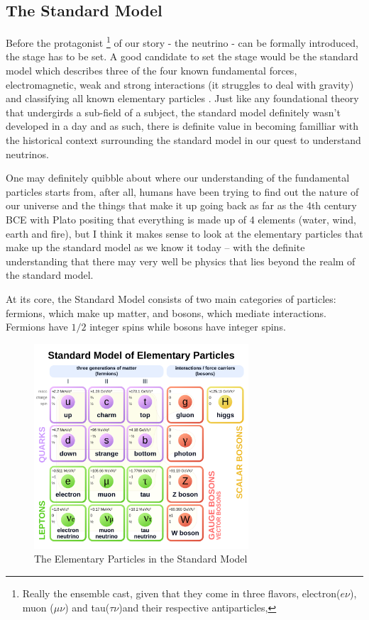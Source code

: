 \subsection{The Standard Model}

Before the protagonist
\footnote{Really the ensemble cast, given that they come in three flavors, electron($e\nu$), muon ($\mu \nu$) and tau($\tau \nu$)and their respective antiparticles,}
of our story - the neutrino - can be formally introduced, the stage has to be set.
A good candidate to set the stage would be the standard model which describes three of the four known fundamental forces, electromagnetic, weak and strong interactions (it struggles to deal with  gravity) and classifying all known elementary particles \cite{Oerter}.
Just like any foundational theory that undergirds a sub-field of a subject, the standard model definitely wasn't developed in a day and as such, there is definite value in becoming familliar with the historical context surrounding the standard model in our quest to understand neutrinos.

One may definitely quibble about where our understanding of the fundamental particles starts from, after all, humans have been trying to find out the nature of our universe and the things that make it up going back as far as the 4th century BCE with Plato positing that everything is made up of 4 elements (water, wind, earth and fire)\cite{Timaeus}, but I think it makes sense to look at the elementary particles that make up the standard model as we know it today -- with the definite understanding that there may very well be physics that lies beyond the realm of the standard model.

At its core, the Standard Model consists of two main categories of particles: fermions, which make up matter, and bosons, which mediate interactions.
Fermions have $1/2$ integer spins while bosons have integer spins.

\begin{figure}[H]
  \centering
  \includegraphics[width=80mm]{figures/sm.png}
  \caption{The Elementary Particles in the Standard Model}
  \label{sm}
\end{figure}

